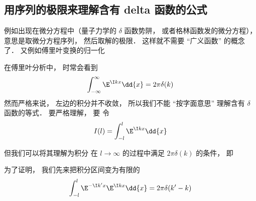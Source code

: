 \subsection{用序列的极限来理解含有 delta 函数的公式}
例如出现在微分方程中（量子力学的 $\delta$ 函数势阱， 或者格林函数发的微分方程）， 意思是取微分方程序列， 然后取解的极限． 这样就不需要 “广义函数” 的概念了． 又例如傅里叶变换的归一化
\begin{example}{}
在傅里叶分析中， 时常会看到
\begin{equation}
\int_{-\infty}^\infty \E^{\I kx}\dd{x} = 2\pi \delta(k)
\end{equation}
然而严格来说， 左边的积分并不收敛， 所以我们不能 “按字面意思” 理解含有 $\delta$ 函数的等式． 要严格理解， 要
令
\begin{equation}
I(l) = \int_{-l}^{l} \E^{\I kx}\dd{x}
\end{equation}



 但我们可以将其理解为积分 在 $l \to \infty$ 的过程中满足 $2\pi\delta(k)$ 的条件， 即 


为了证明， 我们先来把积分区间变为有限的
\begin{equation}
\int_{-l}^{l} \E^{-\I k' x}\E^{\I kx}\dd{x} = 2\pi \delta(k' - k)
\end{equation}
\end{example}
